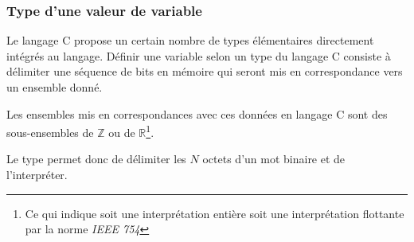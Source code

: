 \documentclass[../../../main.tex]{subfiles}
\begin{document}
\subsubsection{Type d'une valeur de variable}
Le langage C propose un certain nombre de types élémentaires directement intégrés au langage. Définir une variable selon un type du langage C consiste à délimiter une séquence de bits en mémoire qui seront mis en correspondance vers un ensemble donné.

Les ensembles mis en correspondances avec ces données en langage C sont des sous-ensembles de $\mathbb{Z}$ ou de $\mathbb{R}$\footnote{Ce qui indique soit une interprétation entière soit une interprétation flottante par la norme \textit{IEEE 754}}. 

Le type permet donc de délimiter les $N$ octets d'un mot binaire et de l'interpréter.
\end{document}
